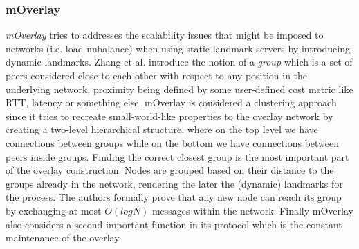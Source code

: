 \subsubsection{mOverlay}
\emph{mOverlay} \cite{zhang_moverlay_2004} tries to addresses the scalability
issues that might be imposed to networks (i.e. load unbalance) when using static
landmark servers by introducing dynamic landmarks. Zhang et al. introduce the
notion of a \emph{group} which is a set of peers considered close to each other
with respect to any position in the underlying network, proximity being defined
by some user-defined cost metric like RTT, latency or something else. mOverlay
is considered a clustering approach since it tries to recreate small-world-like
properties to the overlay network by creating a two-level hierarchical
structure, where on the top level we have connections between groups while on
the bottom we have connections between peers inside groups. Finding the correct
closest group is the most important part of the overlay construction. Nodes are
grouped based on their distance to the groups already in the network, rendering
the later the (dynamic) landmarks for the process. The authors formally prove
that any new node can reach its group by exchanging at most $O(logN)$ messages
within the network. Finally mOverlay also considers a second important function
in its protocol which is the constant maintenance of the overlay.

